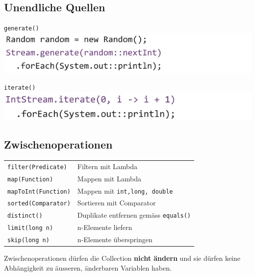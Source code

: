 {\subsection{Unendliche Quellen}
    \begin{minipage}{0.5\linewidth}
        \verb|generate()| \\
        \includegraphics[width=1.2\linewidth]{pictures/generate.jpg}
    \end{minipage}
    \hfill
    \begin{minipage}{0.5\linewidth}
        \verb|iterate()| \\
        \includegraphics[width=1.2\linewidth]{pictures/iterate.jpg}
    \end{minipage}
    \vspace{-0.3cm}

\subsection{Zwischenoperationen}
    \begin{tabular}{l l}
        \verb|filter(Predicate) | & Filtern mit Lambda \\
        \verb|map(Function)     | & Mappen mit Lambda \\
        \verb|mapToInt(Function)| & Mappen mit \verb|int,long, double| \\
        \verb|sorted(Comparator)| & Sortieren mit Comparator \\
        \verb|distinct()        | & Duplikate entfernen gemäss \verb|equals()| \\
        \verb|limit(long n)     | & n-Elemente liefern \\
        \verb|skip(long n)      | & n-Elemente überspringen \\
    \end{tabular}

    Zwischenoperationen dürfen die Collection \textbf{nicht ändern} und sie dürfen keine Abhängigkeit zu äusseren, änderbaren Variablen haben.
    \vspace{-0.3cm}

}

